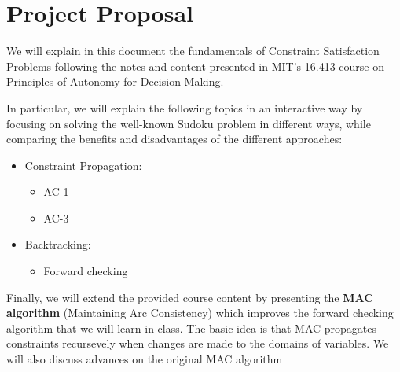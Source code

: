 \chapter{Project Proposal}\label{sec:project_proposal}

We will explain in this document the fundamentals of Constraint Satisfaction Problems following the notes and content presented in MIT's 16.413 course on Principles of Autonomy for Decision Making.

In particular, we will explain the following topics in an interactive way by focusing on solving the well-known Sudoku problem in different ways, while comparing the benefits and disadvantages of the different approaches:
\begin{itemize}
  \item Constraint Propagation:
    \begin{itemize}
      \item AC-1
      \item AC-3
    \end{itemize}
  \item Backtracking:
    \begin{itemize}
      \item Forward checking
    \end{itemize}
\end{itemize}

Finally, we will extend the provided course content by presenting the \textbf{MAC algorithm} (Maintaining Arc Consistency) which improves the forward checking algorithm that we will learn in class.
The basic idea is that MAC propagates constraints recursevely when changes are made to the domains of variables.
We will also discuss advances on the original MAC algorithm \cite{Chavalit2004mac}
